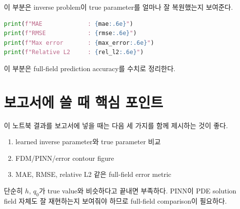 \documentclass[11pt]{article}
\begin{document}
이 부분은 inverse problem이 true parameter를 얼마나 잘 복원했는지 보여준다.

\begin{lstlisting}[language=Python]
print(f"MAE             : {mae:.6e}")
print(f"RMSE            : {rmse:.6e}")
print(f"Max error       : {max_error:.6e}")
print(f"Relative L2     : {rel_l2:.6e}")
\end{lstlisting}

이 부분은 full-field prediction accuracy를 수치로 정리한다.

\section{보고서에 쓸 때 핵심 포인트}

이 노트북 결과를 보고서에 넣을 때는 다음 세 가지를 함께 제시하는 것이 좋다.

\begin{enumerate}[leftmargin=*]
    \item learned inverse parameter와 true parameter 비교
    \item FDM/PINN/error contour figure
    \item MAE, RMSE, relative L2 같은 full-field error metric
\end{enumerate}

단순히 \(h\), \(q_0\)가 true value와 비슷하다고 끝내면 부족하다.
PINN이 PDE solution field 자체도 잘 재현하는지 보여줘야 하므로 full-field comparison이 필요하다.
\end{document}
